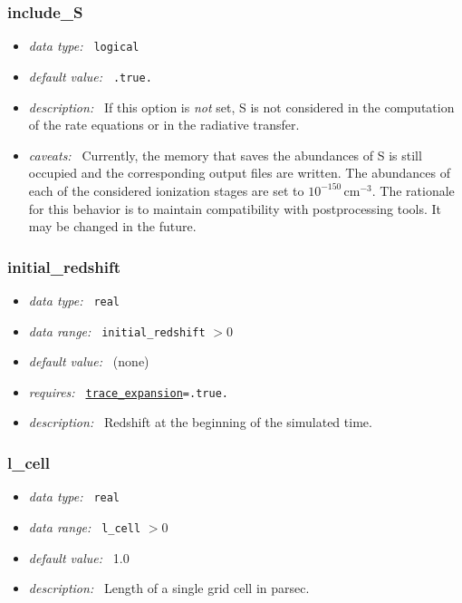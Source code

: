 \documentclass[a4paper,10pt]{article}
\begin{document}
\subsubsection{include\_S}
\label{opt:includes}
\begin{itemize}
 \item \textit{data type:~} \texttt{logical}
 \item \textit{default value:~} \texttt{.true.}
 \item \textit{description:~} If this option is 
 \textit{not} set, S is not considered 
 in the computation of the rate equations or in the
 radiative transfer. 
 \item \textit{caveats:~} Currently, the memory that saves the 
 abundances of S is still occupied and the corresponding output
 files are written. The abundances of each of the considered ionization
 stages are set to $10^{-150}\,\mathrm{cm^{-3}}$. The rationale for
 this behavior is to maintain compatibility with postprocessing
 tools. It may be changed in the future.
\end{itemize}


\subsubsection{initial\_redshift}
\label{opt:initialredshift}
\begin{itemize}
 \item \textit{data type:~} \texttt{real}
 \item \textit{data range:~} \texttt{initial\_redshift} $> 0$
 \item \textit{default value:~} (none)
 \item \textit{requires:~} \texttt{\hyperref[opt:traceexpansion]{trace\_expansion}=.true.}
 \item \textit{description:~} Redshift at the beginning of the simulated time.
\end{itemize}


\subsubsection{l\_cell}
\label{opt:lcell}
\begin{itemize}
 \item \textit{data type:~} \texttt{real}
 \item \textit{data range:~} \texttt{l\_cell} $> 0$
 \item \textit{default value:~} 1.0
 \item \textit{description:~} Length of a single grid cell in parsec.
\end{itemize}
\end{document}
